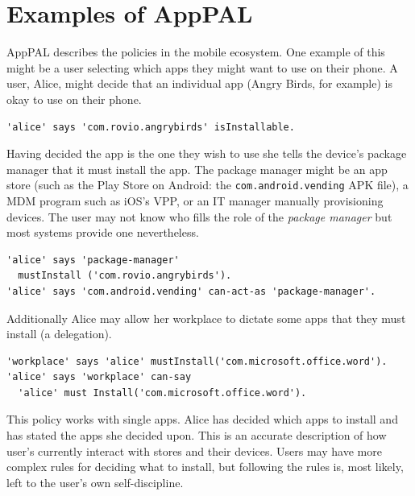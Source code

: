 \documentclass[thesis.tex]{subfiles}
\begin{document}
\section{Examples of AppPAL}

AppPAL describes the policies in the mobile ecosystem.
One example of this might be a user selecting which apps they might want to use on their phone.
A user, Alice, might decide that an individual app (Angry Birds, for example) is okay to use on their phone.
\begin{lstlisting}
'alice' says 'com.rovio.angrybirds' isInstallable.
\end{lstlisting}
Having decided the app is the one they wish to use she tells the device's package manager that it must install the app.
The package manager might be an app store (such as the Play Store on Android: the \texttt{com.android.vending} APK file), a \ac{MDM} program such as iOS's \ac{VPP}, or an IT manager manually provisioning devices.
The user may not know who fills the role of the \emph{package manager} but most systems provide one nevertheless.
\begin{lstlisting}
'alice' says 'package-manager'
  mustInstall ('com.rovio.angrybirds').
'alice' says 'com.android.vending' can-act-as 'package-manager'.
\end{lstlisting}
Additionally Alice may allow her workplace to dictate some apps that they must install (a delegation).
\begin{lstlisting}
'workplace' says 'alice' mustInstall('com.microsoft.office.word').
'alice' says 'workplace' can-say
  'alice' must Install('com.microsoft.office.word').
\end{lstlisting}
This policy works with single apps.
Alice has decided which apps to install and has stated the apps she decided upon.
This is an accurate description of how user's currently interact with stores and their devices.
Users may have more complex rules for deciding what to install, but following the rules is, most likely, left to the user's own self-discipline.
\end{document}
